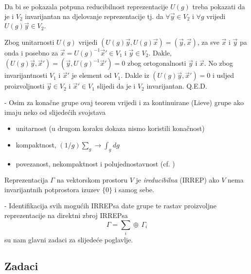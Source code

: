 Da bi se pokazala potpuna reducibilnost
reprezentacije $U(g)$ treba pokazati da  je i $V_2$ invarijantan na djelovanje
reprezentacije tj. da 
$\forall\vec{y} \in V_2$ i $\forall g$ vrijedi $U(g) \vec{y} \in V_2$.

Zbog unitarnosti $U(g)$ vrijedi $(U(g) \vec{y} , U(g)\vec{x}) = 
(\vec{y}, \vec{x})$,
za sve $\vec{x}$ i $\vec{y}$ pa onda i posebno za 
$\vec{x}=U(g)^{-1}\vec{x}'\in V_1$ i
$\vec{y} \in V_2$. Dakle, $(U(g)\vec{y}, \vec{x}')=(\vec{y}, U(g)^{-1}\vec{x}')
=0$ zbog ortogonalnosti $\vec{y}$ i $\vec{x}$.
No zbog invarijantnosti $V_1$ i $\vec{x}'$ je element od $V_1$. Dakle iz
$(U(g) \vec{y} , \vec{x}') = 0$ i usljed proizvoljnosti $\vec{y}\in V_2$
i $\vec{x}'\in V_1$ slijedi da je i $V_2$ invarijantan. Q.E.D.


- Osim za konačne grupe ovaj teorem vrijedi i za kontinuirane (Lieve) grupe
ako imaju neko od slijedećih svojstava
\begin{itemize}
\item unitarnost (u drugom koraku dokaza nismo koristili konačnost)
\item kompaktnost,  $(1/g)\sum_g \to \int_g dg$
\item povezanost, nekompaktnost i polujednostavnost (cf. \cite[79]{Cornwell:1997})
\end{itemize}


\begin{definicija}
Reprezentacija $\Gamma$ na vektorskom prostoru $V$ je
\emph{ireducibilna} (IRREP) ako $V$ nema invarijantnih potprostora
izuzev $\{0\}$ i samog sebe.
\end{definicija}


- Identifikacija svih mogućih IRREPsa date grupe te rastav
  proizvoljne reprezentacije na direktni zbroj IRREPsa
\begin{displaymath}
  \Gamma = \sum_{i} \oplus\, \Gamma_{i}
\end{displaymath}
  su nam glavni zadaci za slijedeće poglavlje.



\subsection*{Zadaci}

